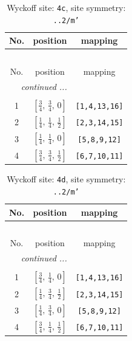 \documentclass[fleqn,8pt]{jsarticle}
\begin{document}
\renewcommand{\arraystretch}{1.2}
\begin{longtable}{ccc}
\caption{Wyckoff site: {\tt 4c}, site symmetry: {\tt ..2/m'}}
 \\
 \hline \hline
No. & position & mapping \\ \hline \endfirsthead

\multicolumn{2}{l}{\tablename\ \thetable{}} \\
 \hline \hline
No. & position & mapping \\ \hline \endhead

 \hline \hline
\multicolumn{2}{r}{\footnotesize\it continued ...} \\ \endfoot

 \hline \hline
\multicolumn{2}{r}{} \\ \endlastfoot

1 & $\left[ \frac{3}{4},\, \frac{3}{4},\, 0 \right]$ & {\tt [1,4,13,16]} \\ \hline
2 & $\left[ \frac{1}{4},\, \frac{1}{4},\, \frac{1}{2} \right]$ & {\tt [2,3,14,15]} \\ \hline
3 & $\left[ \frac{1}{4},\, \frac{1}{4},\, 0 \right]$ & {\tt [5,8,9,12]} \\ \hline
4 & $\left[ \frac{3}{4},\, \frac{3}{4},\, \frac{1}{2} \right]$ & {\tt [6,7,10,11]} \\
\end{longtable}
\renewcommand{\arraystretch}{1.2}
\begin{longtable}{ccc}
\caption{Wyckoff site: {\tt 4d}, site symmetry: {\tt ..2/m'}}
 \\
 \hline \hline
No. & position & mapping \\ \hline \endfirsthead

\multicolumn{2}{l}{\tablename\ \thetable{}} \\
 \hline \hline
No. & position & mapping \\ \hline \endhead

 \hline \hline
\multicolumn{2}{r}{\footnotesize\it continued ...} \\ \endfoot

 \hline \hline
\multicolumn{2}{r}{} \\ \endlastfoot

1 & $\left[ \frac{3}{4},\, \frac{1}{4},\, 0 \right]$ & {\tt [1,4,13,16]} \\ \hline
2 & $\left[ \frac{1}{4},\, \frac{3}{4},\, \frac{1}{2} \right]$ & {\tt [2,3,14,15]} \\ \hline
3 & $\left[ \frac{1}{4},\, \frac{3}{4},\, 0 \right]$ & {\tt [5,8,9,12]} \\ \hline
4 & $\left[ \frac{3}{4},\, \frac{1}{4},\, \frac{1}{2} \right]$ & {\tt [6,7,10,11]} \\
\end{longtable}
\end{document}
